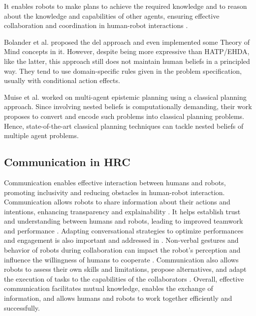     It enables robots to make plans to achieve the required knowledge and to reason about the knowledge and capabilities of other agents, ensuring effective collaboration and coordination in human-robot interactions \cite{belle_epistemic_2023}.

    Bolander et al. proposed the \acrfull{del} approach \cite{bolander_gentle_2017} and even implemented some Theory of Mind concepts in it. However, despite being more expressive than HATP/EHDA, like the latter, this approach still does not maintain human beliefs in a principled way. They tend to use domain-specific rules given in the problem specification, usually with conditional action effects. 

    Muise et al. worked on multi-agent epistemic planning using a classical planning approach. Since involving nested beliefs is computationally demanding, their work proposes to convert and encode such problems into classical planning problems. Hence, state-of-the-art classical planning techniques can tackle nested beliefs of multiple agent problems. 

    
    \subsection{Communication in HRC}

    Communication enables effective interaction between humans and robots, promoting inclusivity and reducing obstacles in human-robot interaction. Communication allows robots to share information about their actions and intentions, enhancing transparency and explainability \cite{mcmillan_human-robot_2023}. It helps establish trust and understanding between humans and robots, leading to improved teamwork and performance \cite{verhagen_influence_2022}. 
    Adapting conversational strategies to optimize performances and engagement is also important and addressed in \cite{galland_adapting_2022}.
    Non-verbal gestures and behavior of robots during collaboration can impact the robot's perception and influence the willingness of humans to cooperate \cite{arntz_collaborating_2022}. Communication also allows robots to assess their own skills and limitations, propose alternatives, and adapt the execution of tasks to the capabilities of the collaborators \cite{ferrari_bidirectional_2022}. Overall, effective communication facilitates mutual knowledge, enables the exchange of information, and allows humans and robots to work together efficiently and successfully.


